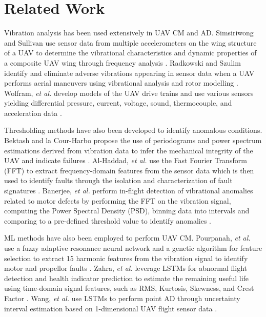 \section{Related Work}
Vibration analysis has been used extensively in UAV CM and AD. Simsiriwong and Sullivan use sensor data from multiple accelerometers on the wing structure of a UAV to determine the vibrational characteristics and dynamic properties of a composite UAV wing through frequency analysis \cite{simsiriwong2012experimental}. Radkowski and Szulim identify and eliminate adverse vibrations appearing in sensor data when a UAV performs aerial maneuvers using vibrational analysis and rotor modelling \cite{radkowski2014analysis}. Wolfram, \textit{et al.} develop models of the UAV drive trains and use various sensors yielding differential pressure, current, voltage, sound, thermocouple, and acceleration data \cite{wolfram2018condition}. \par
Thresholding methods have also been developed to identify anomalous conditions. Bektash and la Cour-Harbo propose the use of periodograms and power spectrum estimations derived from vibration data to infer the mechanical integrity of the UAV and indicate failures \cite{bektash2020vibration}. Al-Haddad, \textit{et al.} use the Fast Fourier Transform (FFT) to extract frequency-domain features from the sensor data which is then used to identify faults through the isolation and characterization of fault signatures \cite{al2023investigation}. Banerjee, \textit{et al.} perform in-flight detection of vibrational anomalies related to motor defects by performing the FFT on the vibration signal, computing the Power Spectral Density (PSD), binning data into intervals and comparing to a pre-defined threshold value to identify anomalies \cite{banerjee2020flight}. \par
ML methods have also been employed to perform UAV CM. Pourpanah, \textit{et al.} use a fuzzy adaptive resonance neural network and a genetic algorithm for feature selection to extract 15 harmonic features from the vibration signal to identify motor and propellor faults \cite{pourpanah2018anomaly}. Zahra, \textit{et al.} leverage LSTMs for abnormal flight detection and health indicator prediction to estimate the remaining useful life using time-domain signal features, such as RMS, Kurtosis, Skewness, and Crest Factor \cite{zahra2021predictive}. Wang, \textit{et al.}  use LSTMs to perform point AD through uncertainty interval estimation based on 1-dimensional UAV flight sensor data \cite{wang2019data}.

